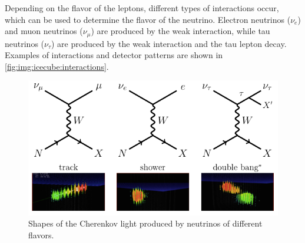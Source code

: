 

Depending on the flavor of the leptons,
  different types of interactions occur,
  which can be used to determine the flavor of the neutrino.
Electron neutrinos ($\nu_e$) and muon neutrinos ($\nu_\mu$) are produced by the weak interaction,
  while tau neutrinos ($\nu_\tau$) are produced by the weak interaction
  and the tau lepton decay.
Examples of interactions and detector patterns are shown in \autoref{fig:img:icecube:interactions}.



\begin{figure}
  \centering
  \includegraphics[width=\textwidth]{content/img/flavors1.png}
  \caption{
    Shapes of the Cherenkov light produced by neutrinos of different flavors.
    \citationneeded
  }
  \label{fig:img:icecube:interactions}
\end{figure}


